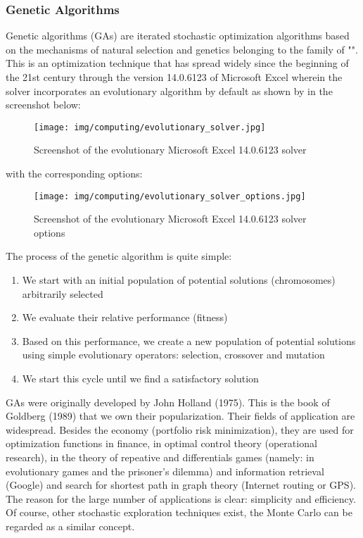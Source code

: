 	\subsubsection{Genetic Algorithms}\label{genetic algorithms}
	Genetic algorithms (GAs) are iterated  stochastic optimization algorithms based on the mechanisms of natural selection and genetics belonging to the family of "". This is an optimization technique that has spread widely since the beginning of the 21st century through the version 14.0.6123 of Microsoft Excel wherein the solver incorporates an evolutionary algorithm by default as shown by in the screenshot below:
	\begin{figure}[H]
		\centering
		\texttt{[image: img/computing/evolutionary\_solver.jpg]}
		\caption[]{Screenshot of the evolutionary Microsoft Excel 14.0.6123 solver}
	\end{figure}
	with the corresponding options:
	\begin{figure}[H]
		\centering
		\texttt{[image: img/computing/evolutionary\_solver\_options.jpg]}
		\caption[]{Screenshot of the evolutionary Microsoft Excel 14.0.6123 solver options}
	\end{figure}
	The process of the genetic algorithm is quite simple:
	\begin{enumerate}
		\item We start with an initial population of potential solutions (chromosomes) arbitrarily selected 

		\item We evaluate their relative performance (fitness) 

		\item Based on this performance, we create a new population of potential solutions using simple evolutionary operators: selection, crossover and mutation

		\item We start this cycle until we find a satisfactory solution
	\end{enumerate}
	GAs were originally developed by John Holland (1975). This is the book of Goldberg (1989) that we own their popularization. Their fields of application are widespread. Besides the economy (portfolio risk minimization), they are used for optimization functions in  finance, in optimal control theory (operational research), in the theory of repeative and differentials games (namely: in evolutionary games and the prisoner's dilemma) and information retrieval (Google) and search for shortest path in graph theory (Internet routing or GPS). The reason for the large number of applications is clear: simplicity and efficiency. Of course, other stochastic exploration techniques exist, the Monte Carlo can be regarded as a similar concept.
	
